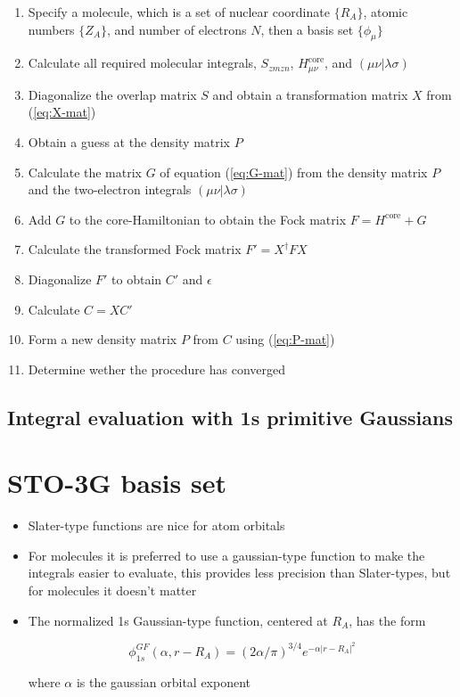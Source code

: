 \documentclass[11pt]{article}
\begin{document}
\begin{enumerate}
\item Specify a molecule, which is a set of nuclear coordinate \(\{R_A\}\), atomic numbers \(\{Z_A\}\), and number of electrons \(N\), then a basis set \(\{\phi_{\mu}\}\)

\item Calculate all required molecular integrals, \(S_{zmzn}\), \(H_{\mu\nu}^{\text{core}}\), and \((\mu\nu|\lambda\sigma)\)

\item Diagonalize the overlap matrix \(S\) and obtain a transformation matrix \(X\) from (\ref{eq:X-mat})

\item Obtain a guess at the density matrix \(P\)

\item Calculate the matrix \(G\) of equation (\ref{eq:G-mat}) from the density matrix \(P\) and the two-electron integrals \((\mu\nu|\lambda\sigma)\)

\item Add \(G\) to the core-Hamiltonian to obtain the Fock matrix \(F = H^{\text{core}} + G\)

\item Calculate the transformed Fock matrix \(F' = X^{\dagger}FX\)

\item Diagonalize \(F'\) to obtain \(C'\) and \(\epsilon\)

\item Calculate \(C= X C'\)

\item Form a new density matrix \(P\) from \(C\) using (\ref{eq:P-mat})

\item Determine wether the procedure has converged
\end{enumerate}
\subsection{Integral evaluation with 1s primitive Gaussians}
\label{sec:org0185c9f}
\section{STO-3G basis set}
\label{sec:org5d45c60}

\begin{itemize}
\item Slater-type functions are nice for atom orbitals

\item For molecules it is preferred to use a gaussian-type function to make the integrals easier to evaluate, this provides less precision than Slater-types, but for molecules it doesn't matter

\item The normalized 1s Gaussian-type function, centered at \(R_A\), has the form

\[ \phi_{1s}^{GF} (\alpha, r-R_A) = (2\alpha/\pi)^{3/4} e^{-\alpha|r-R_A|^2} \]

where \(\alpha\) is the gaussian orbital exponent
\end{itemize}
\end{document}
